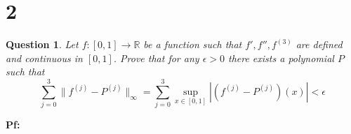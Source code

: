 \documentclass{article}
\newtheorem{question}{Question}
\begin{document}
\begin{itemize}
\begin{comment}
    \textbf{The Sequence of Polynomial Converges Uniformly to $0$:}

    Recall that since $\{p_m\}_{m\in\mathbb{N}}$ converges pointwise to $0$, then for all $i\in\{1,...,101\}$, $\lim_{m\rightarrow\infty}p_m(x_i)=0$.

    Also, from the previous section, since $T^{-1}$ is continuous (possibly on a restricted domain), for all $\epsilon>0$, there exists $\delta>0$, such that for all $u\in\mathbb{R}^{101}$, $\|u\|_2<\delta$ implies $\|T^{-1}(u)\|_\infty<\epsilon$.

    \hfill

    Using the pointwise convergence, for the given $\delta>0$ (which $\frac{\delta}{\sqrt{101}}>0$), each $i\in\{1,...,101\}$ has a corresponding $M_i$, such that $m\geq M_i$ implies $|p_m(x_i)|<\frac{\delta}{\sqrt{101}}$.

    Then, let $M = \max_{i\in\{1,...,101\}}\{M_i\}$, for all $m\geq M$ (which $m\geq M_i$ for all $i\in\{1,...,101\}$), the following is true:
    $$\|T(p_m)-T(0)\|_2 = \|T(p_m)\|_2 = \sqrt{\sum_{i=1}^{101}|p_m(x_i)|^2} < \sqrt{\sum_{i=1}^{101}\left(\frac{\delta}{\sqrt{101}}\right)^2} = \sqrt{101\cdot \frac{\delta^2}{101}} = \sqrt{\delta^2} = |\delta|=\delta$$
    Hence, by the continuity of $T^{-1}$, $T^{-1}(T(p_m)) = p_m$ satisfies $\|T^{-1}(T(p_m))\|_\infty < \epsilon$, or $\|p_m\|_\infty<\epsilon$.

    Therefore, this concludes that the sequence of polynomials $p_m$ converges to $0$ uniformly.
\end{comment}
\end{itemize}

\hfill

\hfill

\section*{2}
\begin{myBox}[]{}
    \begin{question}
        Let $f:[0,1]\rightarrow\mathbb{R}$ be a function such that $f',f'',f^{(3)}$ are defined and continuous in $[0,1]$.
        Prove that for any $\epsilon>0$ there exists a polynomial $P$ such that
        $$\sum_{j=0}^{3}\|f^{(j)}-P^{(j)}\|_\infty = \sum_{j=0}^{3}\sup_{x\in[0,1]}|(f^{(j)}-P^{(j)})(x)|<\epsilon$$
    \end{question}
\end{myBox}

\textbf{Pf:}
\end{document}
